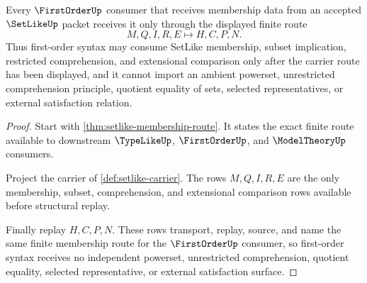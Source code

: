 \begin{theorem}
\label{thm:setlike-firstorder-membership-handoff}
Every $\FirstOrderUp$ consumer that receives membership data from an accepted $\SetLikeUp$ packet receives it only through the displayed finite route
$$
M,Q,I,R,E \longmapsto H,C,P,N .
$$
Thus first-order syntax may consume SetLike membership, subset implication, restricted comprehension, and extensional comparison only after the carrier route has been displayed, and it cannot import an ambient powerset, unrestricted comprehension principle, quotient equality of sets, selected representatives, or external satisfaction relation.
\end{theorem}
\begin{proof}
Start with \autoref{thm:setlike-membership-route}. It states the exact finite route available to downstream $\TypeLikeUp$, $\FirstOrderUp$, and $\ModelTheoryUp$ consumers.

Project the carrier of \autoref{def:setlike-carrier}. The rows $M,Q,I,R,E$ are the only membership, subset, comprehension, and extensional comparison rows available before structural replay.

Finally replay $H,C,P,N$. These rows transport, replay, source, and name the same finite membership route for the $\FirstOrderUp$ consumer, so first-order syntax receives no independent powerset, unrestricted comprehension, quotient equality, selected representative, or external satisfaction surface.
\end{proof}

